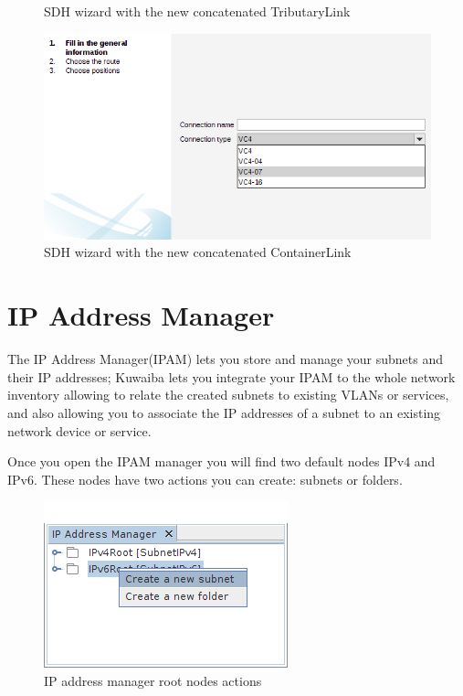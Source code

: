 \documentclass[a4paper]{article}
\begin{document}
\begin{enumerate}
\begin{figure}[h!]
				\caption{SDH wizard with the new concatenated TributaryLink}
				\label{fig:sdh_module_tributary_link_report}
			\end{figure}
			\begin{figure}[h!]
				\centering
				\includegraphics[width=0.7\linewidth]{img/sdh_module_wizard_concatenated_container.png}
				\caption{SDH wizard with the new concatenated ContainerLink}
				\label{fig:sdh_module_tributary_link_report}
			\end{figure}
			
		\end{enumerate}
		\clearpage
		\section{IP Address Manager}\label{sec:ip_address_manager}
		The IP Address Manager(IPAM) lets you store and manage your subnets and their IP addresses; Kuwaiba lets you integrate your IPAM to the whole network inventory allowing to relate the created subnets to existing VLANs or services, and also allowing you to associate the IP addresses of a subnet to an existing network device or service.
		
		Once you open the IPAM manager you will find two default nodes IPv4 and IPv6.
		These nodes have two actions you can create: subnets or folders.
		\begin{figure}[h!]
			\centering
			\includegraphics[width=0.4\linewidth]{img/ipam_root_nodes_actions.png}
			\caption{IP address manager root nodes actions}
			\label{fig:ipam_root_nodes_actions}
		\end{figure}
		
\end{document}

